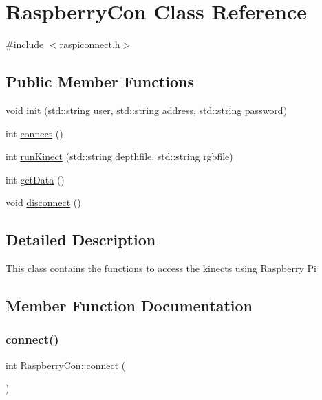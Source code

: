 \hypertarget{class_raspberry_con}{}\section{Raspberry\+Con Class Reference}
\label{class_raspberry_con}


{\ttfamily \#include $<$raspiconnect.\+h$>$}

\subsection*{Public Member Functions}
\begin{DoxyCompactItemize}
\item 
void \hyperlink{class_raspberry_con_a9a0d56ffbc364d070e6fac16be2e2f66}{init} (std\+::string user, std\+::string address, std\+::string password)
\item 
int \hyperlink{class_raspberry_con_a8c8c42dae300b99029c94a88d3adcd6a}{connect} ()
\item 
int \hyperlink{class_raspberry_con_ae7e0a6504fb35362657bc3b01901e790}{run\+Kinect} (std\+::string depthfile, std\+::string rgbfile)
\item 
int \hyperlink{class_raspberry_con_aec1905f70aff683a3ac512511d146fae}{get\+Data} ()
\item 
void \hyperlink{class_raspberry_con_a7d2cd7557ee0dbadd8dc5a02f60a636e}{disconnect} ()
\end{DoxyCompactItemize}


\subsection{Detailed Description}
This class contains the functions to access the kinects using Raspberry Pi 

\subsection{Member Function Documentation}
\hypertarget{class_raspberry_con_a8c8c42dae300b99029c94a88d3adcd6a}{}\label{class_raspberry_con_a8c8c42dae300b99029c94a88d3adcd6a} 
\subsubsection{\texorpdfstring{connect()}{connect()}}
{\footnotesize\ttfamily int Raspberry\+Con\+::connect (\begin{DoxyParamCaption}{ }\end{DoxyParamCaption})}

